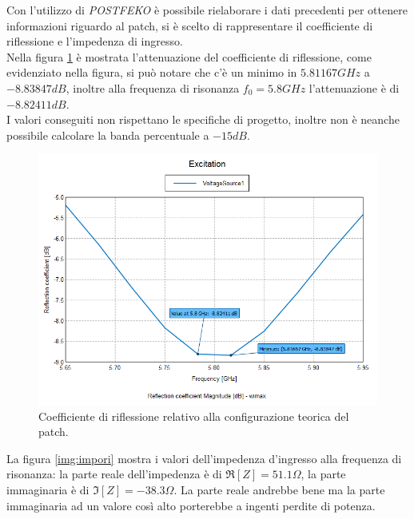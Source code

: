 Con l'utilizzo di \emph{POSTFEKO} è possibile rielaborare i dati precedenti per ottenere informazioni riguardo al patch, si è scelto di rappresentare il coefficiente di riflessione e l'impedenza di ingresso. \\
Nella figura \ref{img:reflori} è mostrata l'attenuazione del coefficiente di riflessione, come evidenziato nella figura, si può notare che c'è un minimo in $5.81167 GHz$ a $-8.83847 dB$, inoltre alla frequenza di risonanza $f_0 = 5.8 GHz$ l'attenuazione è di $-8.82411 dB$. \\
I valori conseguiti non rispettano le specifiche di progetto, inoltre non è neanche possibile calcolare la banda percentuale a $-15 dB$.
\begin{figure}
\centering
\caption{Coefficiente di riflessione relativo alla configurazione teorica del patch.}
\label{img:reflori}
\includegraphics[scale=0.5]{Immagini/reflection_coefficient_original}
\end{figure}

La figura \ref{img:impori} mostra i valori dell'impedenza d'ingresso alla frequenza di risonanza: la parte reale dell'impedenza è di $\Re{[Z]} = 51.1 \Omega $, la parte immaginaria è di  $\Im{[Z]} = -38.3 \Omega$. La parte reale andrebbe bene ma la parte immaginaria ad un valore così alto porterebbe a ingenti perdite di potenza.


